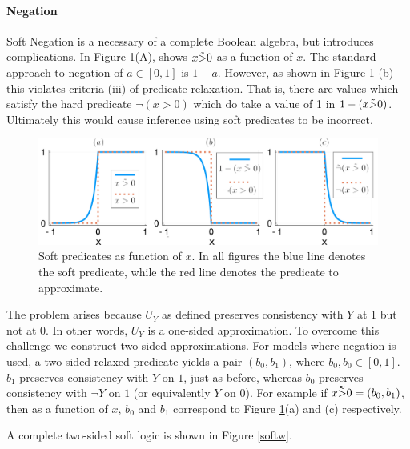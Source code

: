 \paragraph{Negation}
Soft Negation is a necessary of a complete Boolean algebra, but introduces complications.
In Figure \ref{negationimg}(A), shows $x \tilde{>} 0$ as a function of $x$.
The standard \cite{} approach to negation of $a \in [0, 1]$ is $1 - a$.
However, as shown in Figure \ref{negationimg} (b) this violates criteria (iii) of predicate relaxation.
That is, there are values which satisfy the hard predicate $\neg(x > 0)$ which do take a value of 1 in $1 - (x \tilde{>} 0)$.
Ultimately this would cause inference using soft predicates to be incorrect.

\begin{figure}
\includegraphics[width=\linewidth]{negation.pdf}
\caption{Soft predicates as function of $x$.  In all figures the blue line denotes the soft predicate, while the red line denotes the predicate to approximate.}\label{negationimg}
\end{figure}


The problem arises because $U_Y$ as defined preserves consistency with $Y$ at 1 but not at 0.
In other words, $U_Y$ is a one-sided approximation.
To overcome this challenge we construct two-sided approximations.
For models where negation is used, a two-sided relaxed predicate yields a pair $(b_0, b_1)$, where $b_0, b_0 \in [0, 1]$.
$b_1$ preserves consistency with $Y$ on $1$, just as before, whereas $b_0$ preserves consistency with $\neg Y$ on $1$ (or equivalently $Y$ on 0).
For example if $x \accentset{\approx}{>} 0 = (b_0, b_1)$, then as a function of $x$, $b_0$ and $b_1$ correspond to Figure \ref{negationimg}(a) and (c) respectively.

A complete two-sided soft logic is shown in Figure \ref{softw}.
 
